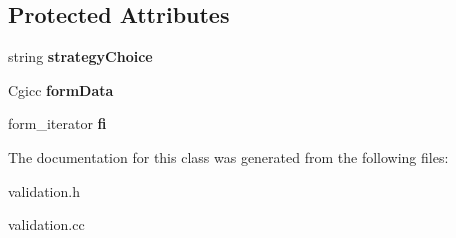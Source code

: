 \subsection*{Protected Attributes}
\begin{DoxyCompactItemize}
\item 
\hypertarget{classValidation_a1313f03a0092ea1d882a60fecaa58e67}{string {\bfseries strategy\-Choice}}\label{classValidation_a1313f03a0092ea1d882a60fecaa58e67}

\item 
\hypertarget{classValidation_a4224a467d43a9df314a78ee22061d8d6}{Cgicc {\bfseries form\-Data}}\label{classValidation_a4224a467d43a9df314a78ee22061d8d6}

\item 
\hypertarget{classValidation_abc319ff9dba2f9d78f68a825c345d093}{form\-\_\-iterator {\bfseries fi}}\label{classValidation_abc319ff9dba2f9d78f68a825c345d093}

\end{DoxyCompactItemize}


The documentation for this class was generated from the following files\-:\begin{DoxyCompactItemize}
\item 
validation.\-h\item 
validation.\-cc\end{DoxyCompactItemize}
